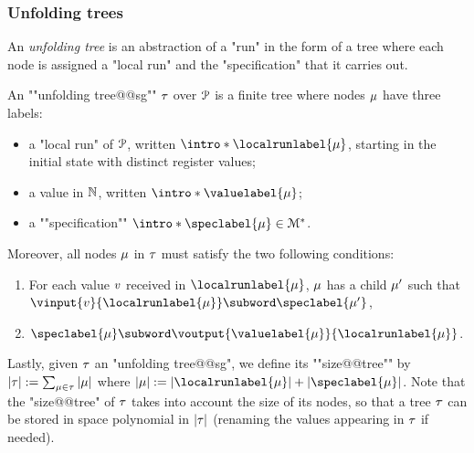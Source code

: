\subsubsection{Unfolding trees}
\label{sec:unfolding_tree_signature}
An \emph{unfolding tree} is an abstraction of a "run" in the form of a tree where each node is assigned a "local run" and the "specification" that it carries out. 

\begin{definition}
\label{def:unfolding_tree_signature}
\AP An ""unfolding tree@@sg"" $\tau$ over $\mathcal{P}$ is
a finite tree where nodes $\mu$ have three labels:
\begin{itemize}
	\item a "local run" of $\mathcal{P}$, written $\intro*\localrunlabel{\node}$, starting in the initial state with distinct register values;
	
	\item a value in $\mathbb{N}$, written $\intro*\valuelabel{\node}$;
	
	\item a ""specification"" $\intro*\speclabel{\node} \in \messages^*$.
\end{itemize} 
Moreover, all nodes $\mu$ in $\tau$ must satisfy the two following conditions:
\begin{enumerate}[label= (\roman*), ref=(\roman*)]
	\item \label{item:condition1_non_initial_value_sg} For each value $v$ received in $\localrunlabel{\node}$, $\mu$ has a child $\mu'$ such that $\vinput{\aval}{\localrunlabel{\node}} \subword \speclabel{\node'}$,
	\item \label{item:condition2_boss_node_sg} $\speclabel{\node} \subword \voutput{\valuelabel{\node}}{\localrunlabel{\node}}$.
\end{enumerate}

\AP Lastly, given $\tau$ an "unfolding tree@@sg", we define its ""size@@tree"" by $|\tau| := \sum_{\mu \in \tau} |\mu|$ where $\size{\node} := \size{\localrunlabel{\node}} + \size{\speclabel{\node}}$. Note that the "size@@tree" of $\tau$ takes into account the size of its nodes, so that a tree $\tau$ can be stored in space polynomial in $|\tau|$ (renaming the values appearing in $\tau$ if needed). 
\end{definition}

